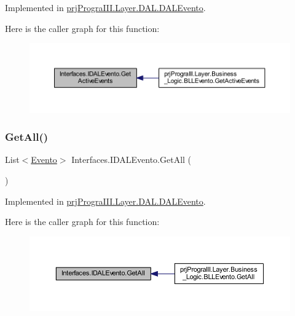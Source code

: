 Implemented in \hyperlink{classprj_progra_i_i_i_1_1_layer_1_1_d_a_l_1_1_d_a_l_evento_ad6d492b77a450533f979d1a67993fb17}{prj\+Progra\+I\+I\+I.\+Layer.\+D\+A\+L.\+D\+A\+L\+Evento}.

Here is the caller graph for this function\+:
\nopagebreak
\begin{figure}[H]
\begin{center}
\leavevmode
\includegraphics[width=350pt]{interface_interfaces_1_1_i_d_a_l_evento_ab7b63b6b4b49fea14ead7a91733ed973_icgraph}
\end{center}
\end{figure}
\hypertarget{interface_interfaces_1_1_i_d_a_l_evento_a5e84cfafdfe63179fa12003120e4d1cf}{}\label{interface_interfaces_1_1_i_d_a_l_evento_a5e84cfafdfe63179fa12003120e4d1cf} 
\subsubsection{\texorpdfstring{Get\+All()}{GetAll()}}
{\footnotesize\ttfamily List$<$\hyperlink{classprj_progra_i_i_i_1_1_layer_1_1_entities_1_1_evento}{Evento}$>$ Interfaces.\+I\+D\+A\+L\+Evento.\+Get\+All (\begin{DoxyParamCaption}{ }\end{DoxyParamCaption})}



Implemented in \hyperlink{classprj_progra_i_i_i_1_1_layer_1_1_d_a_l_1_1_d_a_l_evento_a513523b7c4cb6204629239b3c06c3baa}{prj\+Progra\+I\+I\+I.\+Layer.\+D\+A\+L.\+D\+A\+L\+Evento}.

Here is the caller graph for this function\+:
\nopagebreak
\begin{figure}[H]
\begin{center}
\leavevmode
\includegraphics[width=350pt]{interface_interfaces_1_1_i_d_a_l_evento_a5e84cfafdfe63179fa12003120e4d1cf_icgraph}
\end{center}
\end{figure}
\hypertarget{interface_interfaces_1_1_i_d_a_l_evento_a52962146e03ae6b9b86e487e01640832}{}\label{interface_interfaces_1_1_i_d_a_l_evento_a52962146e03ae6b9b86e487e01640832} 

